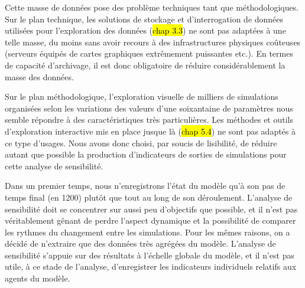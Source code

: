 Cette masse de données pose des problème techniques tant que méthodologiques.
Sur le plan technique, les solutions de stockage et d'interrogation de données utilisées pour l'exploration des données (\hl{chap 3.3}) ne sont pas adaptées à une telle masse, du moins sans avoir recours à des infrastructures physiques coûteuses (serveurs équipés de cartes graphiques extrêmement puissantes etc.).
En termes de capacité d'archivage, il est donc obligatoire de réduire considérablement la masse des données.

Sur le plan méthodologique, l'exploration visuelle de milliers de simulations organisées selon les variations des valeurs d'une soixantaine de paramètres nous semble répondre à des caractéristiques très particulières.
Les méthodes et outils d'exploration interactive mis en place jusque là (\hl{chap 5.4}) ne sont pas adaptés à ce type d'usages.
Nous avons donc choisi, par soucis de lisibilité, de réduire autant que possible la production d'indicateurs de sorties de simulations pour cette analyse de sensibilité.

Dans un premier temps, nous n'enregistrons l'état du modèle qu'à son pas de temps final (en 1200) plutôt que tout au long de son déroulement.
L'analyse de sensibilité doit se concentrer sur aussi peu d'objectifs que possible, et il n'est pas véritablement gênant de perdre l'aspect dynamique et la possibilité de comparer les rythmes du changement entre les simulations.
Pour les mêmes raisons, on a décidé de n'extraire que des données très agrégées du modèle.
L'analyse de sensibilité s'appuie sur des résultats à l'échelle globale du modèle, et il n'est pas utile, à ce stade de l'analyse, d'enregistrer les indicateurs individuels relatifs aux agents du modèle.

